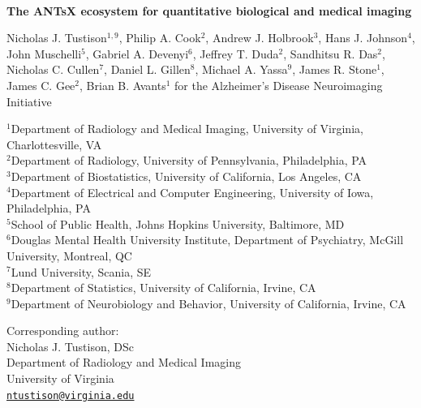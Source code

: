 \documentclass[
  12pt,
]{article}
\author{}
\date{\vspace{-2.5em}}
\begin{document}


\begin{centering}

$ $

\vspace{4.cm}

\LARGE

{\bf The ANTsX ecosystem for quantitative biological and medical imaging}

\vspace{0.5 cm}

\normalsize

Nicholas J. Tustison$^{1,9}$,
Philip A. Cook$^{2}$,
Andrew J. Holbrook$^{3}$,
Hans J. Johnson$^{4}$,
John Muschelli$^{5}$,
Gabriel A. Devenyi$^{6}$,
Jeffrey T. Duda$^{2}$,
Sandhitsu R. Das$^{2}$,
Nicholas C. Cullen$^{7}$,
Daniel L. Gillen$^{8}$,
Michael A. Yassa$^{9}$,
James R. Stone$^{1}$,
James C. Gee$^{2}$,
Brian B. Avants$^{1}$
for the Alzheimer’s Disease Neuroimaging Initiative

\footnotesize

$^{1}$Department of Radiology and Medical Imaging, University of Virginia, Charlottesville, VA \\
$^{2}$Department of Radiology, University of Pennsylvania, Philadelphia, PA \\
$^{3}$Department of Biostatistics, University of California, Los Angeles, CA \\
$^{4}$Department of Electrical and Computer Engineering, University of Iowa, Philadelphia, PA \\
$^{5}$School of Public Health, Johns Hopkins University, Baltimore, MD \\
$^{6}$Douglas Mental Health University Institute, Department of Psychiatry, McGill University, Montreal, QC \\
$^{7}$Lund University, Scania, SE \\
$^{8}$Department of Statistics, University of California, Irvine, CA \\
$^{9}$Department of Neurobiology and Behavior, University of California, Irvine, CA \\

\end{centering}

\vspace{4.5 cm}

\scriptsize

Corresponding author:\\
Nicholas J. Tustison, DSc\\
Department of Radiology and Medical Imaging\\
University of Virginia\\
\href{mailto:ntustison@virginia.edu}{\nolinkurl{ntustison@virginia.edu}}
\end{document}
